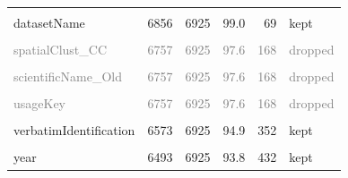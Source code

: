 \documentclass[sn-apa,pdflatex]{sn-jnl}
\begin{document}
\begin{longtable}[t]{lrrrrl}
\textcolor{gray}{\cellcolor{gray!10}{species}} & \textcolor{gray}{\cellcolor{gray!10}{6864}} & \textcolor{gray}{\cellcolor{gray!10}{6925}} & \textcolor{gray}{\cellcolor{gray!10}{99.1}} & \textcolor{gray}{\cellcolor{gray!10}{61}} & \textcolor{gray}{\cellcolor{gray!10}{dropped}}\\
datasetName & 6856 & 6925 & 99.0 & 69 & kept\\
\textcolor{gray}{\cellcolor{gray!10}{duplicated\_CC}} & \textcolor{gray}{\cellcolor{gray!10}{6757}} & \textcolor{gray}{\cellcolor{gray!10}{6925}} & \textcolor{gray}{\cellcolor{gray!10}{97.6}} & \textcolor{gray}{\cellcolor{gray!10}{168}} & \textcolor{gray}{\cellcolor{gray!10}{dropped}}\\
\textcolor{gray}{spatialClust\_CC} & \textcolor{gray}{6757} & \textcolor{gray}{6925} & \textcolor{gray}{97.6} & \textcolor{gray}{168} & \textcolor{gray}{dropped}\\
\addlinespace
\textcolor{gray}{\cellcolor{gray!10}{rObjectRank\_CC}} & \textcolor{gray}{\cellcolor{gray!10}{6757}} & \textcolor{gray}{\cellcolor{gray!10}{6925}} & \textcolor{gray}{\cellcolor{gray!10}{97.6}} & \textcolor{gray}{\cellcolor{gray!10}{168}} & \textcolor{gray}{\cellcolor{gray!10}{dropped}}\\
\textcolor{gray}{scientificName\_Old} & \textcolor{gray}{6757} & \textcolor{gray}{6925} & \textcolor{gray}{97.6} & \textcolor{gray}{168} & \textcolor{gray}{dropped}\\
\textcolor{gray}{\cellcolor{gray!10}{IncludePewProAP}} & \textcolor{gray}{\cellcolor{gray!10}{6757}} & \textcolor{gray}{\cellcolor{gray!10}{6925}} & \textcolor{gray}{\cellcolor{gray!10}{97.6}} & \textcolor{gray}{\cellcolor{gray!10}{168}} & \textcolor{gray}{\cellcolor{gray!10}{dropped}}\\
\textcolor{gray}{usageKey} & \textcolor{gray}{6757} & \textcolor{gray}{6925} & \textcolor{gray}{97.6} & \textcolor{gray}{168} & \textcolor{gray}{dropped}\\
\cellcolor{gray!10}{license} & \cellcolor{gray!10}{6666} & \cellcolor{gray!10}{6925} & \cellcolor{gray!10}{96.3} & \cellcolor{gray!10}{259} & \cellcolor{gray!10}{kept}\\
\addlinespace
verbatimIdentification & 6573 & 6925 & 94.9 & 352 & kept\\
\cellcolor{gray!10}{bibliographicCitation} & \cellcolor{gray!10}{6521} & \cellcolor{gray!10}{6925} & \cellcolor{gray!10}{94.2} & \cellcolor{gray!10}{404} & \cellcolor{gray!10}{kept}\\
year & 6493 & 6925 & 93.8 & 432 & kept\\

\end{longtable}
\end{document}
